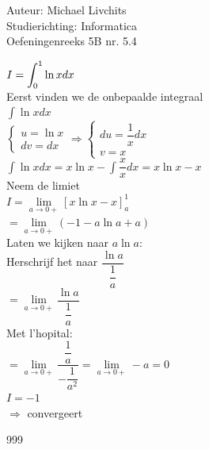 \documentclass[a4paper]{article}
\newcommand{\dint}{\displaystyle\int}
\begin{document}
  
\noindent \large Auteur: Michael Livchits \\
\noindent \large Studierichting: Informatica\\
\noindent \large Oefeningenreeks 5B nr. 5.4\\

\medskip

\normalsize

$I = \displaystyle\dint_{0}^{1} \ln xdx$\\

Eerst vinden we de onbepaalde integraal\\

$\displaystyle\int \ln xdx$\\

$\left\{
    \begin{array}{l}
        u =  \ln x \\
        dv = dx
    \end{array}
\right .
\Rightarrow
\left\{
    \begin{array}{l}
        du = \dfrac{1}{x}dx \\
        v = x
    \end{array}
\right .$\\

$\displaystyle\int \ln xdx = x\ln x - \displaystyle\int\dfrac{x}{x}dx= x\ln x - x$\\

Neem de limiet\\

$I = \lim\limits_{a\rightarrow 0+}\left[x\ln x - x\right]_{a}^{1}$\\

$= \lim\limits_{a\rightarrow 0+}\left(- 1 - a\ln a + a\right)$\\

Laten we kijken naar $a\ln a$:\\

Herschrijf het naar $\dfrac{\ln a}{\dfrac{1}{a}}$\\

$= \lim\limits_{a\rightarrow 0+}\dfrac{\ln a}{\dfrac{1}{a}}$\\

Met l'hopital:\\

$= \lim\limits_{a\rightarrow 0+}\dfrac{\dfrac{1}{a}}{-\dfrac{1}{a^2}} = \lim\limits_{a\rightarrow 0+}-a = 0$\\

$I = -1$\\

$\Rightarrow$ convergeert\\

\begin{thebibliography}{999}
\end{thebibliography}
\end{document}
